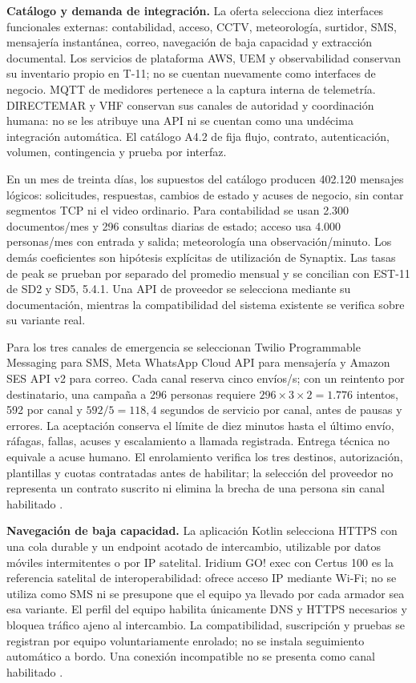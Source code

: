 \textbf{Catálogo y demanda de integración.}
La oferta selecciona diez interfaces funcionales externas: contabilidad, acceso, CCTV, meteorología, surtidor, SMS, mensajería instantánea, correo, navegación de baja capacidad y extracción documental. Los servicios de plataforma AWS, UEM y observabilidad conservan su inventario propio en T-11; no se cuentan nuevamente como interfaces de negocio. MQTT de medidores pertenece a la captura interna de telemetría. DIRECTEMAR y VHF conservan sus canales de autoridad y coordinación humana: no se les atribuye una API ni se cuentan como una undécima integración automática. El catálogo A4.2 de  fija flujo, contrato, autenticación, volumen, contingencia y prueba por interfaz.

En un mes de treinta días, los supuestos del catálogo producen 402.120 mensajes lógicos: solicitudes, respuestas, cambios de estado y acuses de negocio, sin contar segmentos TCP ni el video ordinario. Para contabilidad se usan 2.300 documentos/mes y 296 consultas diarias de estado; acceso usa 4.000 personas/mes con entrada y salida; meteorología una observación/minuto. Los demás coeficientes son hipótesis explícitas de utilización de Synaptix. Las tasas de peak se prueban por separado del promedio mensual y se concilian con EST-11 de SD2 y SD5, 5.4.1. Una API de proveedor se selecciona mediante su documentación, mientras la compatibilidad del sistema existente se verifica sobre su variante real.

Para los tres canales de emergencia se seleccionan Twilio Programmable Messaging para SMS, Meta WhatsApp Cloud API para mensajería y Amazon SES API v2 para correo. Cada canal reserva cinco envíos/s; con un reintento por destinatario, una campaña a 296 personas requiere $296\times3\times2=1.776$ intentos, 592 por canal y $592/5=118,4$ segundos de servicio por canal, antes de pausas y errores. La aceptación conserva el límite de diez minutos hasta el último envío, ráfagas, fallas, acuses y escalamiento a llamada registrada. Entrega técnica no equivale a acuse humano. El enrolamiento verifica los tres destinos, autorización, plantillas y cuotas contratadas antes de habilitar; la selección del proveedor no representa un contrato suscrito ni elimina la brecha de una persona sin canal habilitado \parencites{c8-twilio-mensajes,c8-meta-mensajes,c8-ses-eventos}[cap.~15, RT-16.21]{caso07}.

\textbf{Navegación de baja capacidad.}
La aplicación Kotlin selecciona HTTPS con una cola durable y un endpoint acotado de intercambio, utilizable por datos móviles intermitentes o por IP satelital. Iridium GO! exec con Certus 100 es la referencia satelital de interoperabilidad: ofrece acceso IP mediante Wi-Fi; no se utiliza como SMS ni se presupone que el equipo ya llevado por cada armador sea esa variante. El perfil del equipo habilita únicamente DNS y HTTPS necesarios y bloquea tráfico ajeno al intercambio. La compatibilidad, suscripción y pruebas se registran por equipo voluntariamente enrolado; no se instala seguimiento automático a bordo. Una conexión incompatible no se presenta como canal habilitado \parencites{c8-iridium-exec,c8-iridium-faq}.

